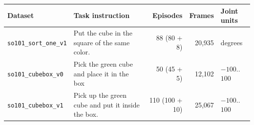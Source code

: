 \begin{tabularx}{\textwidth}{l X r r l}
\toprule
Dataset & Task instruction & Episodes & Frames & Joint units \\
\midrule
\texttt{so101\_sort\_one\_v1} & Put the cube in the square of the same color. & 88 (80 + 8) & 20{,}935 & degrees \\
\texttt{so101\_cubebox\_v0} & Pick the green cube and place it in the box & 50 (45 + 5) & 12{,}102 & $-100$..$100$ \\
\texttt{so101\_cubebox\_v1} & Pick up the green cube and put it inside the box. & 110 (100 + 10) & 25{,}067 & $-100$..$100$ \\
\bottomrule
\end{tabularx}
